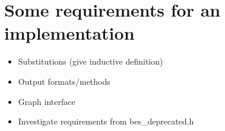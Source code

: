 \documentclass[a4paper,11pt]{article}
\begin{document}
\section{Some requirements for an implementation}
\begin{itemize}
\item Substitutions (give inductive definition)
\item Output formats/methods
\item Graph interface
\item Investigate requirements from bes\_deprecated.h
\end{itemize}
\end{document}
